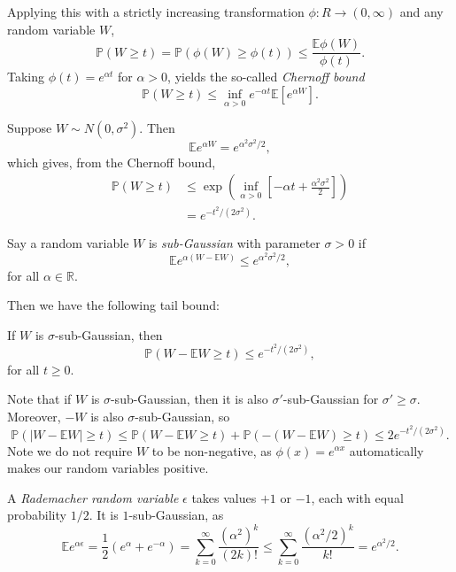 \documentclass[12pt]{article}
\begin{document}
Applying this with a strictly increasing transformation $\phi : R \to (0, \infty)$ and any random variable $W$,
\[
\mathbb{P}(W \geq t) = \mathbb{P}(\phi(W) \geq \phi(t)) \leq \frac{\mathbb{E} \phi(W)}{\phi(t)}.
\]
Taking $\phi(t) = e^{\alpha t}$ for $\alpha > 0$, yields the so-called \emph{Chernoff bound}
\[
\mathbb{P}(W \geq t) \leq \inf_{\alpha > 0} e^{-\alpha t} \mathbb{E}[e^{\alpha W}].
\]

\begin{exbox}
	Suppose $W \sim N(0, \sigma^2)$. Then
	\[
	\mathbb{E} e^{\alpha W} = e^{\alpha^2 \sigma^2/2},
	\]
	which gives, from the Chernoff bound,
	\begin{align*}
		\mathbb{P}(W \geq t) &\leq \exp \left( \inf_{\alpha > 0} \left[ - \alpha t + \frac{\alpha^2\sigma^2}{2} \right] \right) \\
		&= e^{-t^2/(2\sigma^2)}.
	\end{align*}
\end{exbox}

\begin{definition}
	Say a random variable $W$ is \emph{sub-Gaussian} with parameter $\sigma > 0$ if
	\[
	\mathbb{E} e^{\alpha(W - \mathbb{E} W)} \leq e^{\alpha^2 \sigma^2/2},
	\]
	for all $\alpha \in \mathbb{R}$.
\end{definition}

Then we have the following tail bound:

\begin{proposition}
	If $W$ is $\sigma$-sub-Gaussian, then
	\[
	\mathbb{P}(W - \mathbb{E} W \geq t) \leq e^{-t^2/(2\sigma^2)},
	\]
	for all $t \geq 0$.
\end{proposition}

Note that if $W$ is $\sigma$-sub-Gaussian, then it is also $\sigma'$-sub-Gaussian for $\sigma' \geq \sigma$. Moreover, $-W$ is also $\sigma$-sub-Gaussian, so
\[
\mathbb{P}(|W - \mathbb{E}W| \geq t) \leq \mathbb{P}(W - \mathbb{E}W \geq t) + \mathbb{P}(-(W - \mathbb{E} W) \geq t) \leq 2e^{-t^2/(2\sigma^2)}.
\]
Note we do not require $W$ to be non-negative, as $\phi(x) = e^{\alpha x}$ automatically makes our random variables positive.

\begin{exbox}
	A \emph{Rademacher random variable} $\epsilon$ takes values $+1$ or $-1$, each with equal probability $1/2$. It is $1$-sub-Gaussian, as
	\[
	\mathbb{E} e^{\alpha \epsilon} = \frac{1}{2}(e^\alpha + e^{-\alpha}) = \sum_{k = 0}^{\infty} \frac{(\alpha^2)^k}{(2k)!} \leq \sum_{k = 0}^\infty \frac{(\alpha^2/2)^k}{k!} = e^{\alpha^2/2}.
	\]
\end{exbox}
\end{document}

